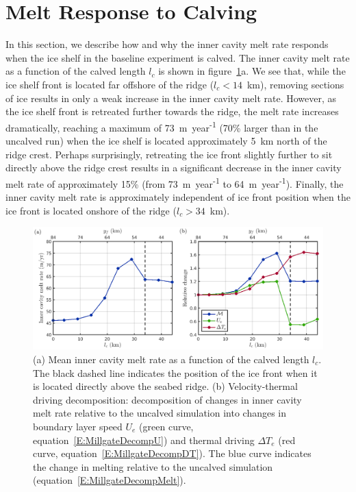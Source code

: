 \documentclass[draft]{agujournal2019}
\begin{document}
\section{Melt Response to Calving}\label{S:Results:lc}
In this section, we describe how and why the inner cavity melt rate responds when the ice shelf in the baseline experiment is calved. The inner cavity melt rate as a function of the calved length $l_c$ is shown in figure~\ref{fig:figure4}a. We see that, while the ice shelf front is located far offshore of the ridge ($l_c< 14$~km), removing sections of ice results in only a weak increase in the inner cavity melt rate. However, as the ice shelf front is retreated further towards the ridge, the melt rate increases dramatically, reaching a maximum of 73~m~year\textsuperscript{-1} (70\% larger than in the uncalved run) when the ice shelf is located approximately 5~km north of the ridge crest. Perhaps surprisingly, retreating the ice front slightly further to sit directly above the ridge crest results in a significant decrease in the inner cavity melt rate of approximately 15\% (from 73~m~year\textsuperscript{-1} to 64~m~year\textsuperscript{-1}). Finally, the inner cavity melt rate is approximately independent of ice front position when the ice front is located onshore of the ridge ($l_c>34$~km).

\begin{figure}
    \centering
    \includegraphics[width = \textwidth]{../make_figures/plots/figure4.png}
    \caption{(a) Mean inner cavity melt rate as a function of the calved length $l_c$. The black dashed line indicates the position of the ice front when it is located directly above the seabed ridge. (b) Velocity-thermal driving decomposition: decomposition of changes in inner cavity melt rate relative to the uncalved simulation into changes in boundary layer speed $U_e$ (green curve, equation~\eqref{E:MillgateDecompU}) and thermal driving $\Delta T_e$ (red curve, equation~\eqref{E:MillgateDecompDT}). The blue curve indicates the change in melting relative to the uncalved simulation (equation~\eqref{E:MillgateDecompMelt}).}
    \label{fig:figure4}
\end{figure}
\end{document}
